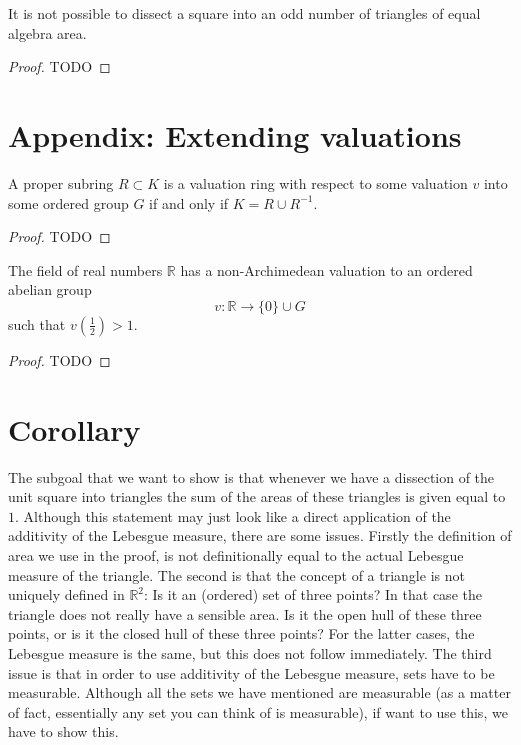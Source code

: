 \begin{theorem}
  \label{monsky_theorem}
  It is not possible to dissect a square into an odd number of triangles of equal algebra area.
\end{theorem}
\begin{proof}
  TODO
\end{proof}


\section*{Appendix: Extending valuations}

\begin{lemma}
  \label{valuation_lemma}
  A proper subring $R\subset K$ is a valuation ring with respect to some
  valuation $v$ into some ordered group $G$ if and only if $K = R \cup R^{-1}$.
\end{lemma}
\begin{proof}
  TODO
\end{proof}

\begin{theorem}
  \label{valuation_on_reals}
  The field of real numbers $\mathbb{R}$ has a non-Archimedean valuation
  to an ordered abelian group
  \[v: \mathbb{R} \to \{0\} \cup G\]
  such that $v(\frac{1}{2}) > 1$.
\end{theorem}
\begin{proof}
  TODO
\end{proof}


\section{Corollary}

The subgoal that we want to show is that whenever we have a dissection of the unit square into
triangles the sum of the areas of these triangles is given equal to $1$. Although this statement
may just look like a direct application of the additivity of the Lebesgue measure, there are
some issues. Firstly the definition of area we use in the proof, is not definitionally equal
to the actual Lebesgue measure of the triangle. The second is that the concept of a triangle is
not uniquely defined in $\mathbb{R}^2$: Is it an (ordered) set of three points? In that case the
triangle does not really have a sensible area. Is it the open hull of these three points, or is it
the closed hull of these three points? For the latter cases, the Lebesgue measure is the same, but
this does not follow immediately. The third issue is that in order to use additivity of the Lebesgue
measure, sets have to be measurable. Although all the sets we have mentioned are measurable
(as a matter of fact, essentially any set you can think of is measurable), if want to use this, we
have to show this.

